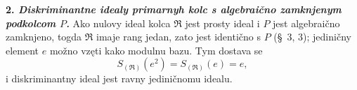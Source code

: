 \documentclass[11pt]{article}
\begin{document}
\setcounter{footnote}{27}

\textbf{2. \emph{Diskriminantne idealy primarnyh kolc s algebraično zamknjenym podkolcom $P$.}} Ako nulovy ideal kolca $\mathfrak R$ jest prosty ideal i $P$ jest algebraično zamknjeno, togda $\mathfrak R$ imaje rang jedan, zato jest identično s $P$ (\S~3, 3); jediničny element $e$ možno vzęti kako modulnu bazu. Tym dostava se
\[
        S_{(\mathfrak R)}(e^2)=S_{(\mathfrak R)}(e)=e,
\]
i diskriminantny ideal jest ravny jediničnomu idealu.
\end{document}
